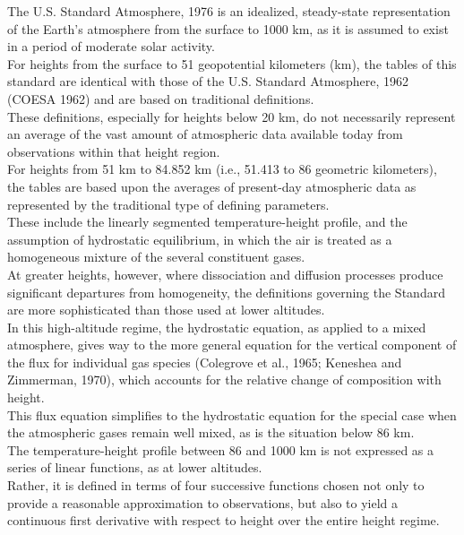 \documentclass{article}
\begin{document}
The U.S. Standard Atmosphere, 1976 is an idealized, steady-state representation of the Earth's atmosphere from the surface to 1000 km, as it is assumed to exist in a period of moderate solar activity.\\

For heights from the surface to 51 geopotential kilometers (km), the tables of this standard are identical with those of the U.S. Standard Atmosphere, 1962 (COESA 1962) and are based on traditional definitions.\\
These definitions, especially for heights below 20 km, do not necessarily represent an average of the vast amount of atmospheric data available today from observations within that height region.\\

For heights from 51 km to 84.852 km (i.e., 51.413 to 86 geometric kilometers), the tables are based upon the averages of present-day atmospheric data as represented by the traditional type of defining parameters.\\
These include the linearly segmented temperature-height profile, and the assumption of hydrostatic equilibrium, in which the air is treated as a homogeneous mixture of the several constituent gases.\\

At greater heights, however, where dissociation and diffusion processes produce significant departures from homogeneity, the definitions governing the Standard are more sophisticated than those used at lower altitudes.\\

In this high-altitude regime, the hydrostatic equation, as applied to a mixed atmosphere, gives way to the more general equation for the vertical component of the flux for individual gas species (Colegrove et al., 1965; Keneshea and Zimmerman, 1970), which accounts for the relative change of composition with height.\\
This flux equation simplifies to the hydrostatic equation for the special case when the atmospheric gases remain well mixed, as is the situation below 86 km.\\

The temperature-height profile between 86 and 1000 km is not expressed as a series of linear functions, as at lower altitudes.\\

Rather, it is defined in terms of four successive functions chosen not only to provide a reasonable approximation to observations, but also to yield a continuous first derivative with respect to height over the entire height regime.\\
\end{document}
